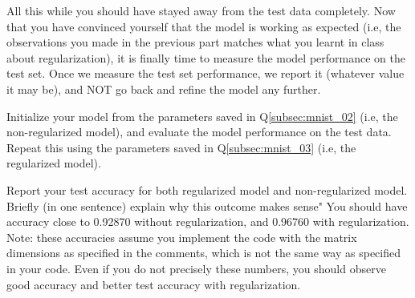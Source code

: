 \item {}
All this while you should have stayed away from the test data completely. Now that
you have convinced yourself that the model is working as expected (i.e, the
observations you made in the previous part matches what you learnt in class
about regularization), it is finally time to measure the model performance on
the test set. Once we measure the test set performance, we report it (whatever
value it may be), and NOT go back and refine the model any further.

Initialize your model from the parameters saved in Q\ref{subsec:mnist_02} (i.e, the non-regularized
model), and evaluate the model performance on the test data. Repeat this using the
parameters saved in Q\ref{subsec:mnist_03} (i.e, the regularized model).

Report your test accuracy for both regularized model and non-regularized model.  
Briefly (in one sentence) explain why this outcome makes sense"
You should have accuracy close to 0.92870 without regularization, and 0.96760 with regularization.
Note: these accuracies assume you implement the code with the matrix dimensions as specified in
the comments, which is not the same way as specified in your code. Even if you do not precisely these
numbers, you should observe good accuracy and better test accuracy with regularization.

